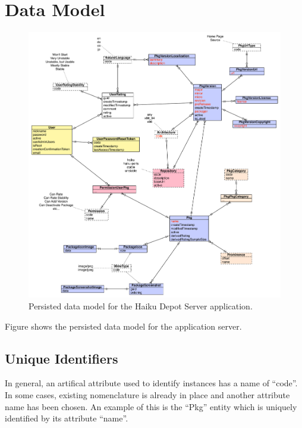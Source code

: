 
\section{Data Model}

\begin{figure}
\centering
\vspace{.2in}
\includegraphics[width=6.5in]{img-datamodel.pdf}
\caption{Persisted data model for the Haiku Depot Server application.}
\label{\thefigure}
\end{figure}

Figure {\thefigure} shows the persisted data model for the application server.

\subsection{Unique Identifiers}

In general, an artifical attribute used to identify instances has a name of ``code''.  In some cases, existing nomenclature is already in place and another attribute name has been chosen.  An example of this is the ``Pkg'' entity which is uniquely identified by its attribute ``name''.

